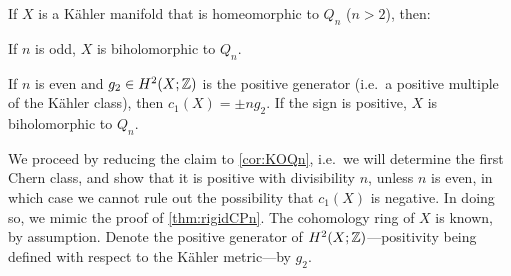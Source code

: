 \begin{thm}
	If $X$ is a K\"ahler manifold that is homeomorphic to $Q_n$ ($n>2$), then:
	\begin{numberedlist}
		\item If $n$ is odd, $X$ is biholomorphic to $Q_n$.
		\item If $n$ is even and $g_2\in H^2(X;\mathbb{Z})$ is the positive generator (i.e.~a positive multiple of the K\"ahler class), then $c_1(X)=\pm n g_2$. If the sign is positive, $X$ is biholomorphic to $Q_n$.
	\end{numberedlist}
\end{thm}
\begin{myproof}
	We proceed by reducing the claim to \cref{cor:KOQn}, i.e.~we will determine the first Chern class, and show that it is positive with divisibility $n$, unless $n$ is even, in which case we cannot rule out the possibility that $c_1(X)$ is negative. In doing so, we mimic the proof of \cref{thm:rigidCPn}. The cohomology ring of $X$ is known, by assumption. Denote the positive generator of $H^2(X;\mathbb{Z})$---positivity being defined with respect to the K\"ahler metric---by $g_2$. 
	

\end{myproof}
